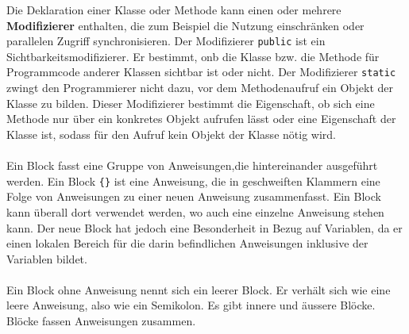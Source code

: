 Die Deklaration einer Klasse oder Methode kann einen oder mehrere \textbf{Modifizierer} enthalten, die zum Beispiel die Nutzung einschränken oder parallelen Zugriff synchronisieren. Der Modifizierer \texttt{public} ist ein Sichtbarkeitsmodifizierer. Er bestimmt, onb die Klasse bzw. die Methode für Programmcode anderer Klassen sichtbar ist oder nicht. Der Modifizierer \texttt{static} zwingt den Programmierer nicht dazu, vor dem Methodenaufruf ein Objekt der Klasse zu bilden. Dieser Modifizierer bestimmt die Eigenschaft, ob sich eine Methode nur über ein konkretes Objekt aufrufen lässt oder eine Eigenschaft der Klasse ist, sodass für den Aufruf kein Objekt der Klasse nötig wird.
\\\\
Ein Block fasst eine Gruppe von Anweisungen,die hintereinander ausgeführt werden. Ein Block \texttt{\{\}} ist eine Anweisung, die in geschweiften Klammern eine Folge von Anweisungen zu einer neuen Anweisung zusammenfasst. Ein Block kann überall dort verwendet werden, wo auch eine einzelne Anweisung stehen kann. Der neue Block hat jedoch eine Besonderheit in Bezug auf Variablen, da er einen lokalen Bereich für die darin befindlichen Anweisungen inklusive der Variablen bildet. 
\\\\
Ein Block ohne Anweisung nennt sich ein leerer Block. Er verhält sich wie eine leere Anweisung, also wie ein Semikolon. Es gibt innere und äussere Blöcke. Blöcke fassen Anweisungen zusammen.
